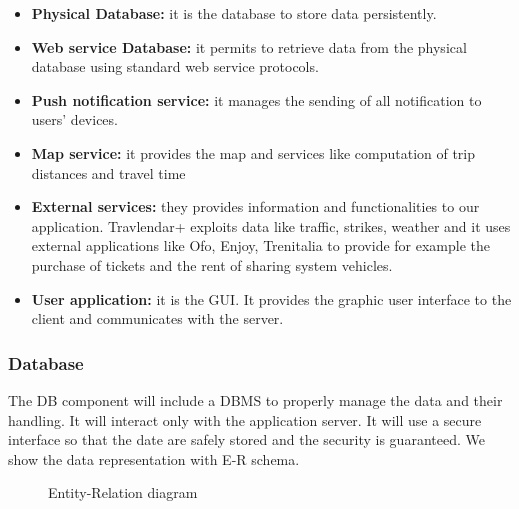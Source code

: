 \documentclass[12pt,titlepage]{article}
\begin{document}
\begin{flushleft}
\begin{itemize}
\item \textbf{Physical Database:} it is the database to store data persistently.
\item \textbf{Web service Database:} it permits to retrieve data from the physical database using standard web service protocols.
\item \textbf{Push notification service:} it manages the sending of all notification to users' devices.
\item \textbf{Map service:} it provides the map and services like computation of trip distances and travel time
\item \textbf{External services:} they provides information and functionalities to our application. Travlendar+ exploits data like traffic, strikes, weather and it uses external applications like Ofo, Enjoy, Trenitalia to provide for example the purchase of tickets and the rent of sharing system vehicles.
\item \textbf{User application: } it is the GUI. It provides the graphic user interface to the client and communicates with the server.
\end{itemize}
\end{flushleft}

\clearpage
\newpage

\subsubsection{Database}
The DB component will include a DBMS to properly manage the data and their handling. It will interact only with the application server. It will use a secure interface so that the date are safely stored and the security is guaranteed.
We show the data representation with  E-R schema.
\begin{figure}[H]
\centering
\makebox[\textwidth]{\texttt{[image: "ER "]}}
\caption{Entity-Relation diagram}
\end{figure}

\clearpage
\newpage
\end{document}
